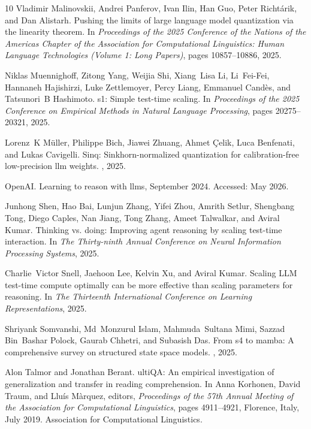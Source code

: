 \documentclass{llmxive}
\begin{document}
\begin{thebibliography}{10}
Vladimir Malinovskii, Andrei Panferov, Ivan Ilin, Han Guo, Peter Richt{\'a}rik, and Dan Alistarh.
\newblock Pushing the limits of large language model quantization via the linearity theorem.
\newblock In {\em Proceedings of the 2025 Conference of the Nations of the Americas Chapter of the Association for Computational Linguistics: Human Language Technologies (Volume 1: Long Papers)}, pages 10857--10886, 2025.

Niklas Muennighoff, Zitong Yang, Weijia Shi, Xiang~Lisa Li, Li~Fei-Fei, Hannaneh Hajishirzi, Luke Zettlemoyer, Percy Liang, Emmanuel Cand{\`e}s, and Tatsunori~B Hashimoto.
\newblock s1: Simple test-time scaling.
\newblock In {\em Proceedings of the 2025 Conference on Empirical Methods in Natural Language Processing}, pages 20275--20321, 2025.

Lorenz~K M{\"u}ller, Philippe Bich, Jiawei Zhuang, Ahmet {\c{C}}elik, Luca Benfenati, and Lukas Cavigelli.
\newblock Sinq: Sinkhorn-normalized quantization for calibration-free low-precision llm weights.
, 2025.

OpenAI.
\newblock Learning to reason with llms, September 2024.
\newblock Accessed: May 2026.

Junhong Shen, Hao Bai, Lunjun Zhang, Yifei Zhou, Amrith Setlur, Shengbang Tong, Diego Caples, Nan Jiang, Tong Zhang, Ameet Talwalkar, and Aviral Kumar.
\newblock Thinking vs. doing: Improving agent reasoning by scaling test-time interaction.
\newblock In {\em The Thirty-ninth Annual Conference on Neural Information Processing Systems}, 2025.

Charlie~Victor Snell, Jaehoon Lee, Kelvin Xu, and Aviral Kumar.
\newblock Scaling {LLM} test-time compute optimally can be more effective than scaling parameters for reasoning.
\newblock In {\em The Thirteenth International Conference on Learning Representations}, 2025.

Shriyank Somvanshi, Md~Monzurul Islam, Mahmuda~Sultana Mimi, Sazzad Bin~Bashar Polock, Gaurab Chhetri, and Subasish Das.
\newblock From s4 to mamba: A comprehensive survey on structured state space models.
, 2025.

Alon Talmor and Jonathan Berant.
ulti{QA}: An empirical investigation of generalization and transfer in reading comprehension.
\newblock In Anna Korhonen, David Traum, and Llu{\'i}s M{\`a}rquez, editors, {\em Proceedings of the 57th Annual Meeting of the Association for Computational Linguistics}, pages 4911--4921, Florence, Italy, July 2019. Association for Computational Linguistics.


\end{thebibliography}
\end{document}
